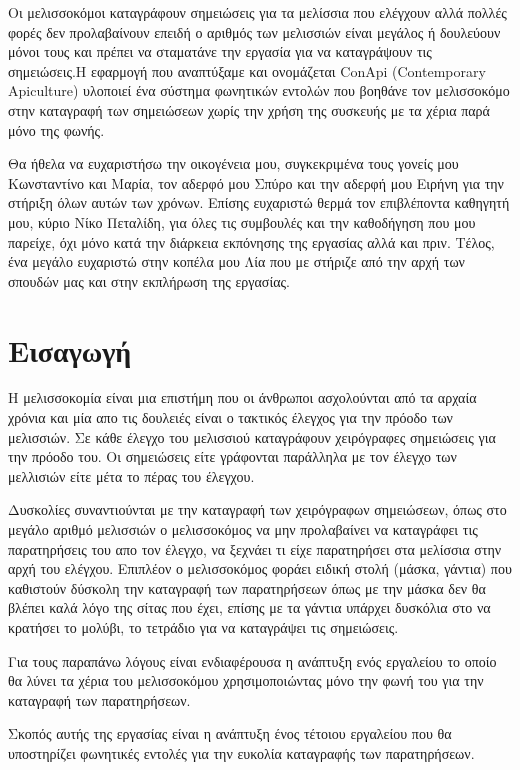 \documentclass[oneside, 12pt]{book}
\begin{document}
\Titlepage
\Declarationpage
\begin{Abstract}
  Οι μελισσοκόμοι καταγράφουν σημειώσεις για τα μελίσσια που ελέγχουν αλλά πολλές φορές δεν προλαβαίνουν επειδή ο αριθμός των μελισσιών είναι μεγάλος ή δουλεύουν μόνοι τους και πρέπει να σταματάνε την εργασία για να καταγράψουν τις σημειώσεις.Η εφαρμογή που αναπτύξαμε και ονομάζεται ConApi (Contemporary Apiculture) υλοποιεί ένα σύστημα φωνητικών εντολών που βοηθάνε τον μελισσοκόμο στην καταγραφή των σημειώσεων χωρίς την χρήση της συσκευής με τα χέρια παρά μόνο της φωνής.
\end{Abstract}
\tableofcontents

\listoftables
\listoffigures


\begin{Acknowledgement}
Θα ήθελα να ευχαριστήσω την οικογένεια μου, συγκεκριμένα τους γονείς μου Κωνσταντίνο και Μαρία, τον αδερφό μου Σπύρο και την αδερφή μου Ειρήνη για την στήριξη όλων αυτών των χρόνων. Επίσης ευχαριστώ θερμά τον επιβλέποντα καθηγητή μου, κύριο Νίκο Πεταλίδη, για όλες τις συμβουλές και την καθοδήγηση που μου παρείχε, όχι μόνο κατά την διάρκεια εκπόνησης της εργασίας αλλά και πριν. Τέλος,
ένα μεγάλο ευχαριστώ στην κοπέλα μου Λία που με στήριζε από την αρχή των σπουδών μας και στην εκπλήρωση της εργασίας.
\end{Acknowledgement}


\chapter{Εισαγωγή}\label{ch:εισαγωγή}
\leftmark\rightmark
Η μελισσοκομία είναι μια επιστήμη που οι άνθρωποι ασχολούνται από τα αρχαία χρόνια και μία απο τις
δουλειές είναι ο τακτικός έλεγχος για την πρόοδο των μελισσιών.
Σε κάθε έλεγχο του μελισσιού καταγράφουν χειρόγραφες σημειώσεις για την πρόοδο του.
Οι σημειώσεις είτε γράφονται παράλληλα με τον έλεγχο των μελλισιών είτε μέτα το πέρας του έλεγχου. \par
Δυσκολίες συναντιούνται με την καταγραφή των χειρόγραφων σημειώσεων, όπως στο μεγάλο αριθμό μελισσιών
ο μελισσοκόμος να μην προλαβαίνει να καταγράφει τις παρατηρήσεις του απο τον έλεγχο, να ξεχνάει τι
είχε παρατηρήσει στα μελίσσια στην αρχή του ελέγχου.
Επιπλέον ο μελισσοκόμος φοράει ειδική στολή (μάσκα, γάντια) που καθιστούν δύσκολη την καταγραφή των
παρατηρήσεων όπως με την μάσκα δεν θα βλέπει καλά λόγο της σίτας που έχει, επίσης με τα γάντια
υπάρχει δυσκόλια στο να κρατήσει το μολύβι, το τετράδιο για να καταγράψει τις σημειώσεις. \par
Για τους παραπάνω λόγους είναι ενδιαφέρουσα η ανάπτυξη ενός εργαλείου το οποίο θα λύνει τα χέρια του
μελισσοκόμου χρησιμοποιώντας μόνο την φωνή του για την καταγραφή των παρατηρήσεων. \par
Σκοπός αυτής της εργασίας είναι η ανάπτυξη ένος τέτοιου εργαλείου που θα υποστηρίζει φωνητικές εντολές για την ευκολία καταγραφής των παρατηρήσεων.
\end{document}

